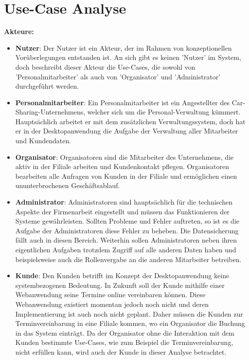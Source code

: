 \section{Use-Case Analyse}

\textbf{Akteure:}


\begin{itemize}
    \item \textbf{Nutzer}: Der Nutzer ist ein Akteur, der im Rahmen von konzeptionellen Vorüberlegungen entstanden ist. An sich gibt es keinen 'Nutzer' im System, doch beschreibt dieser Akteur die Use-Cases, die sowohl von 'Personalmitarbeiter' als auch von 'Organisator' und 'Administrator' durchgeführt werden.
    \item \textbf{Personalmitarbeiter}: Ein Personalmitarbeiter ist ein Angestellter des Car-Sharing-Unternehmens, welcher sich um die Personal-Verwaltung kümmert. Hauptsächlich arbeitet er mit dem zusätzlichen Verwaltungssystem, doch hat er in der Desktopanwendung die Aufgabe der Verwaltung aller Mitarbeiter und Kundendaten.
    \item \textbf{Organisator}: Organisatoren sind die Mitarbeiter des Unternehmens, die aktiv in der Filiale arbeiten und Kundenkontakt pflegen. Organisatoren bearbeiten alle Anfragen von Kunden in der Filiale und ermöglichen einen ununterbrochenen Geschäftsablauf. 
    \item \textbf{Administrator}: Administratoren sind hauptsächlich für die technischen Aspekte der Firmenarbeit eingestellt und müssen das Funktionieren der Systeme gewährleisten. Sollten Probleme und Fehler auftreten, so ist es die Aufgabe der Administratoren diese Fehler zu beheben. Die Datensicherung fällt auch in diesen Bereich. Weiterhin sollen Administratoren neben ihren eigentlichen Aufgaben trotzdem Zugriff auf alle anderen Daten haben und beispielsweise auch die Rollenvergabe an die anderen Mitarbeiter betreiben.
    \item \textbf{Kunde}: Den Kunden betrifft im Konzept der Desktopanwendung keine systembezogenen Bedeutung. In Zukunft soll der Kunde mithilfe einer Webanwendung seine Termine online vereinbaren können. Diese Webanwendung existiert momentan jedoch noch nicht und deren Implementierung ist auch noch nicht geplant. Daher müssen die Kunden zur Terminvereinbarung in eine Filiale kommen, wo ein Organisator die Buchung in das System einträgt. Da der Organisator ohne die Interaktion mit dem Kunden bestimmte Use-Cases, wie zum Beispiel die Terminvereinbarung, nicht erfüllen kann, wird auch der Kunde in dieser Analyse betrachtet.
\end{itemize}

